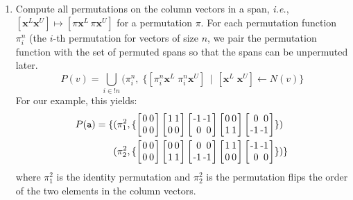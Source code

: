 \documentclass[9pt]{sigplanconf}
\theoremstyle{definition}
\newcommand{\ie}{\emph{i.e.}}
\newcommand{\vect}[1]{\textbf{#1}}
\newcommand{\vtwo}[2]{\setlength{\arraycolsep}{0em}
\left[\begin{array}{l}$#1$\\$#2$\end{array}\right]}
\newcommand{\stwo}[4]
{\setlength{\arraycolsep}{0.1em}
\left[\begin{array}{rr}$#1$ & $#3$\\$#2$ & $#4$\end{array}\right]}
\begin{document}
\begin{enumerate}

\item Compute all permutations on the column vectors in a span, \ie{},
  $[\vect{x}^L \vect{x}^U] \mapsto [\pi\vect{x}^L \, \pi\vect{x}^U]$
for a permutation $\pi$. For each permutation function $\pi^n_i$
(the $i$-th permutation for vectors of size $n$, we pair the
permutation function with the set of permuted spans so that 
the spans can be unpermuted later. 
%
\[
P(v) = \bigcup_{i \in !n} (\pi^n_{i} , \; \{[\pi^n_i
\vect{x}^L \; \pi^n_i\vect{x}^U] \, \mid \, [\vect{x}^L \; \vect{x}^U]
\leftarrow N(v)\}
\]
%
For our example, this yields:
%
\begin{align*}
P(\texttt{a}) = 
\{&(\pi^2_1, \{ \stwo{0}{0}{0}{0}
\stwo{1}{0}{1}{0} 
\stwo{-1}{0}{-1}{0} 
\stwo{0}{1}{0}{1} 
\stwo{0}{-1}{0}{-1} \})
\\
&(\pi^2_2, \{ 
 \stwo{0}{0}{0}{0}
 \stwo{0}{1}{0}{1}
 \stwo{0}{-1}{0}{-1}
 \stwo{1}{0}{1}{0}
 \stwo{-1}{0}{-1}{0}\})\}
\end{align*}
%
where $\pi^2_1$ is the identity permutation and $\pi^2_2$ is the
permutation flips the order of the two elements in the column
vectors. 


\end{enumerate}
\end{document}
